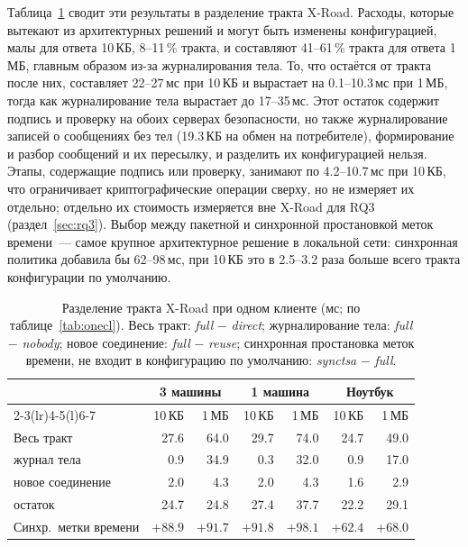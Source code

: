 \documentclass[conference,a4paper]{IEEEtran}
\newcommand{\newgreen}[1]{{\color{green!50!black}#1}}
\begin{document}
{\color{blue}Таблица~\ref{tab:division} сводит эти результаты в разделение тракта X-Road. Расходы, которые
вытекают из архитектурных решений и могут быть изменены конфигурацией, малы для ответа
10\,КБ, 8--11\,\% тракта, и составляют 41--61\,\% тракта для ответа 1\,МБ, главным образом из-за журналирования
тела. То, что остаётся от тракта после них, составляет 22--27\,мс при 10\,КБ и вырастает на 0.1--10.3\,мс
при 1\,МБ, тогда как журналирование тела вырастает до 17--35\,мс. Этот остаток содержит подпись и
проверку на обоих серверах безопасности, но также журналирование записей о сообщениях без тел
(19.3\,КБ на обмен на потребителе), формирование и разбор сообщений и их пересылку, и
разделить их конфигурацией нельзя. Этапы, содержащие подпись или проверку, занимают
по 4.2--10.7\,мс при 10\,КБ, что ограничивает криптографические операции сверху, но не
измеряет их отдельно; отдельно их стоимость измеряется вне X-Road для RQ3
(раздел~\ref{sec:rq3}). Выбор между пакетной и синхронной простановкой меток времени~--- самое крупное
архитектурное решение в локальной сети: синхронная политика добавила бы 62--98\,мс, при 10\,КБ это
в \newgreen{2.5--3.2} раза больше всего тракта конфигурации по умолчанию.\par}

\begin{table}[!htb]
\centering\footnotesize
\setlength{\tabcolsep}{3.5pt}
\caption{Разделение тракта X-Road при одном клиенте (мс; по таблице~\ref{tab:onecl}). Весь тракт:
\emph{full} $-$ \emph{direct}; журналирование тела: \emph{full} $-$ \emph{nobody}; новое соединение:
\emph{full} $-$ \emph{reuse}; синхронная простановка меток времени, не входит в конфигурацию по умолчанию: \emph{synctsa} $-$
\emph{full}.}
\label{tab:division}
\color{blue}
\begin{tabular}{@{}lrrrrrr@{}}
\toprule
& \multicolumn{2}{c}{3 машины} & \multicolumn{2}{c}{1 машина} & \multicolumn{2}{c}{Ноутбук} \\
\cmidrule(lr){2-3}\cmidrule(lr){4-5}\cmidrule(l){6-7}
& 10\,КБ & 1\,МБ & 10\,КБ & 1\,МБ & 10\,КБ & 1\,МБ \\
\midrule
Весь тракт & 27.6 & 64.0 & 29.7 & 74.0 & 24.7 & 49.0 \\
\quad журнал тела & 0.9 & 34.9 & 0.3 & 32.0 & 0.9 & 17.0 \\
\quad новое соединение & 2.0 & 4.3 & 2.0 & 4.3 & 1.6 & 2.9 \\
\quad остаток & 24.7 & 24.8 & 27.4 & 37.7 & 22.2 & 29.1 \\
\midrule
Синхр.\ метки времени & $+88.9$ & $+91.7$ & $+91.8$ & $+98.1$ & $+62.4$ & $+68.0$ \\
\bottomrule
\end{tabular}
\end{table}
\end{document}
